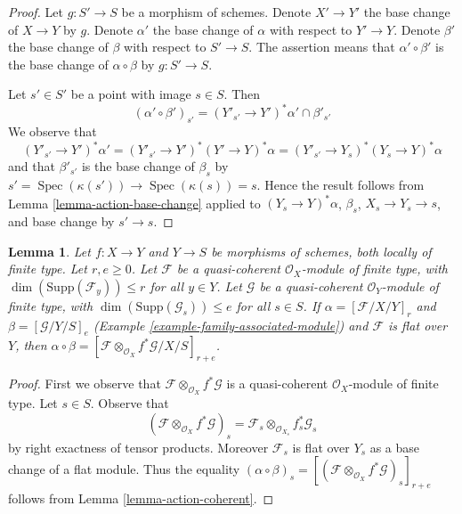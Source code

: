 \documentclass{stacks-project}
\theoremstyle{plain}
\newtheorem{lemma}[subsection]{Lemma}
\theoremstyle{definition}
\theoremstyle{remark}
\numberwithin{equation}{subsection}
\def\Spec{\mathop{\mathrm{Spec}}}
\begin{document}
\begin{proof}
Let $g : S' \to S$ be a morphism of schemes.
Denote $X' \to Y'$ the base change of $X \to Y$ by $g$. Denote
$\alpha'$ the base change of $\alpha$ with respect to $Y' \to Y$.
Denote $\beta'$ the base change of $\beta$ with respect to $S' \to S$.
The assertion means that $\alpha' \circ \beta'$ is the base change
of $\alpha \circ \beta$ by $g : S' \to S$.

\medskip\noindent
Let $s' \in S'$ be a point with image $s \in S$. Then
$$
(\alpha' \circ \beta')_{s'} = (Y'_{s'} \to Y')^*\alpha' \cap \beta'_{s'}
$$
We observe that
$$
(Y'_{s'} \to Y')^*\alpha' =
(Y'_{s'} \to Y')^*(Y' \to Y)^*\alpha =
(Y'_{s'} \to Y_s)^*(Y_s \to Y)^*\alpha
$$
and that $\beta'_{s'}$ is the base change of $\beta_s$ by
$s' = \Spec(\kappa(s')) \to \Spec(\kappa(s)) = s$.
Hence the result follows from Lemma \ref{lemma-action-base-change}
applied to $(Y_s \to Y)^*\alpha$, $\beta_s$,
$X_s \to Y_s \to s$, and base change by $s' \to s$.
\end{proof}

\begin{lemma}
\label{lemma-construction-coherent}
Let $f : X \to Y$ and $Y \to S$ be morphisms of schemes, both locally of
finite type. Let $r, e \geq 0$. Let $\mathcal{F}$ be a quasi-coherent
$\mathcal{O}_X$-module of finite type, with
$\dim(\text{Supp}(\mathcal{F}_y)) \leq r$ for all $y \in Y$.
Let $\mathcal{G}$  be a quasi-coherent $\mathcal{O}_Y$-module of finite
type, with $\dim(\text{Supp}(\mathcal{G}_s)) \leq e$ for all $s \in S$.
If $\alpha = [\mathcal{F}/X/Y]_r$ and $\beta = [\mathcal{G}/Y/S]_e$
(Example \ref{example-family-associated-module}) and $\mathcal{F}$
is flat over $Y$, then $\alpha \circ \beta =
[\mathcal{F} \otimes_{\mathcal{O}_X} f^*\mathcal{G}/X/S]_{r + e}$.
\end{lemma}

\begin{proof}
First we observe that $\mathcal{F} \otimes_{\mathcal{O}_X} f^*\mathcal{G}$
is a quasi-coherent $\mathcal{O}_X$-module of finite type.
Let $s \in S$. Observe that
$$
(\mathcal{F} \otimes_{\mathcal{O}_X} f^*\mathcal{G})_s =
\mathcal{F}_s \otimes_{\mathcal{O}_{X_s}} f_s^*\mathcal{G}_s
$$
by right exactness of tensor products. Moreover $\mathcal{F}_s$
is flat over $Y_s$ as a base change of a flat module. Thus the equality
$(\alpha \circ \beta)_s =
[(\mathcal{F} \otimes_{\mathcal{O}_X} f^*\mathcal{G})_s]_{r + e}$
follows from Lemma \ref{lemma-action-coherent}.
\end{proof}
\end{document}
